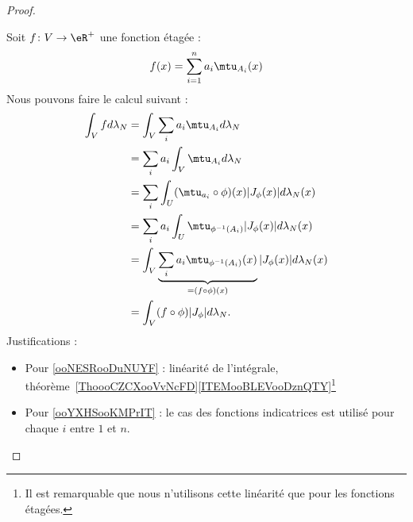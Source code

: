 \begin{proof}
\begin{enumerate}
\begin{subproof}
			      Soit \( f\colon V\to \eR^+\) une fonction étagée :
			      \begin{equation}
				      f(x)=\sum_{i=1}^na_i\mtu_{A_i}(x)
			      \end{equation}
			      Nous pouvons faire le calcul suivant :
			      \begin{subequations}
				      \begin{align}
					      \int_Vfd\lambda_N & =\int_V\sum_ia_i\mtu_{A_i}d\lambda_N                                                                 \\
					                        & =\sum_ia_i\int_{V}\mtu_{A_i}d\lambda_N      \label{ooNESRooDuNUYF}                                   \\
					                        & =\sum_i\int_U(\mtu_{a_i}\circ\phi)(x)| J_{\phi}(x) |d\lambda_N(x)   \label{ooYXHSooKMPrIT}           \\
					                        & =\sum_ia_i\int_U\mtu_{\phi^{-1}(A_i)}| J_{\phi}(x) |d\lambda_N(x)                                    \\
					                        & =\int_V\underbrace{\sum_ia_i\mtu_{\phi^{-1}(A_i)}(x)}_{=(f\circ\phi)(x)}| J_{\phi}(x) |d\lambda_N(x) \\
					                        & =\int_V(f\circ\phi)| J_{\phi} |d\lambda_N.
				      \end{align}
			      \end{subequations}
			      Justifications :
			      \begin{itemize}
				      \item Pour \eqref{ooNESRooDuNUYF} : linéarité de l'intégrale, théorème~\ref{ThoooCZCXooVvNcFD}\ref{ITEMooBLEVooDznQTY}\footnote{Il est remarquable que nous n'utilisons cette linéarité que pour les fonctions étagées.}
				      \item Pour \eqref{ooYXHSooKMPrIT} : le cas des fonctions indicatrices est utilisé pour chaque \( i\) entre \( 1\) et \( n\).
			      \end{itemize}


\end{subproof}
\end{enumerate}
\end{proof}
